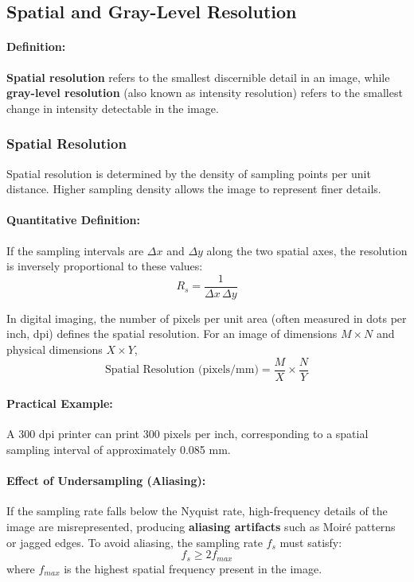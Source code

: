 \documentclass[12pt,a4paper]{AnantDocumentation}
\begin{document}
\subsection{Spatial and Gray-Level Resolution}

\paragraph{Definition:}
\textbf{Spatial resolution} refers to the smallest discernible detail in an image, while \textbf{gray-level resolution} (also known as intensity resolution) refers to the smallest change in intensity detectable in the image.

\subsubsection{Spatial Resolution}
Spatial resolution is determined by the density of sampling points per unit distance. Higher sampling density allows the image to represent finer details.

\paragraph{Quantitative Definition:}
If the sampling intervals are $\Delta x$ and $\Delta y$ along the two spatial axes, the resolution is inversely proportional to these values:
\begin{equation}
R_s = \frac{1}{\Delta x \, \Delta y}
\end{equation}

In digital imaging, the number of pixels per unit area (often measured in dots per inch, dpi) defines the spatial resolution. For an image of dimensions $M \times N$ and physical dimensions $X \times Y$,
\begin{equation}
\text{Spatial Resolution (pixels/mm)} = \frac{M}{X} \times \frac{N}{Y}
\end{equation}

\paragraph{Practical Example:}
A 300 dpi printer can print 300 pixels per inch, corresponding to a spatial sampling interval of approximately 0.085 mm.

\paragraph{Effect of Undersampling (Aliasing):}
If the sampling rate falls below the Nyquist rate, high-frequency details of the image are misrepresented, producing \textbf{aliasing artifacts} such as Moiré patterns or jagged edges. To avoid aliasing, the sampling rate $f_s$ must satisfy:
\begin{equation}
f_s \geq 2f_{max}
\end{equation}
where $f_{max}$ is the highest spatial frequency present in the image.
\end{document}
